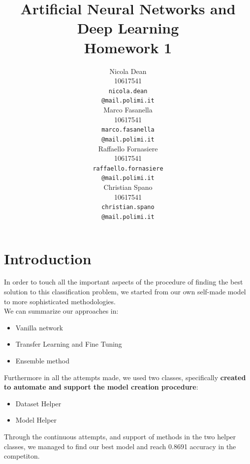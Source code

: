 \documentclass[10pt]{article}
\title{Artificial Neural Networks and Deep Learning \\
Homework 1}
\author{
  Nicola Dean \\
  10617541 \\
  {\tt nicola.dean \\
  \tt @mail.polimi.it} \\\And
  Marco Fasanella \\
  10617541 \\
  {\tt marco.fasanella \\
  \tt @mail.polimi.it} \\\And
  Raffaello Fornasiere \\
    10617541 \\
    {\tt raffaello.fornasiere \\
    \tt @mail.polimi.it} \\\And
  Christian Spano \\
  10617541 \\
  {\tt christian.spano \\
  \tt @mail.polimi.it} \\}
\date{}
\begin{document}
\maketitle



\section{Introduction}
In order to touch all the important aspects of the procedure of finding the best solution to this classification problem,
we started from our own self-made model to more sophisticated methodologies.\\
 We can summarize our approaches in:
\begin{itemize}
  \item Vanilla network
  \item Transfer Learning and Fine Tuning
  \item Ensemble method
\end{itemize}
Furthermore in all the attempts made, we used two classes, specifically \textbf{created to automate and support the model creation
procedure}:
\begin{itemize}
  \item Dataset Helper
  \item Model Helper
\end{itemize}
Through the continuous attempts, and support of methods in the two helper classes, we managed to find our best model and
reach 0.8691 accuracy in the competiton.
\end{document}
